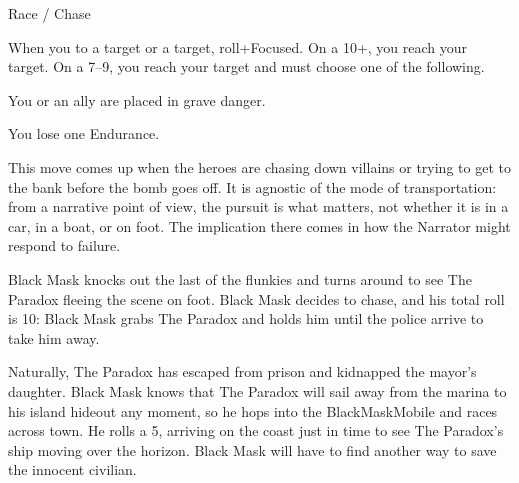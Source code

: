 \begin{movedef}{Race / Chase}
  {
    When you  to a target or 
    a target, roll+Focused. On
    a 10+, you reach your target. On a 7--9, you reach your target and
    must choose one of the following.
    \begin{choices}
    \item You or an ally are placed in grave danger.
    \item You lose one Endurance.
    \end{choices}
    \onamiss{}
  }
  {
    This move comes up when the heroes are chasing down villains
    or trying to get to the bank before the bomb goes off.
    It is agnostic of the mode of transportation: from a narrative
    point of view, the pursuit is what matters, not whether it is
    in a car, in a boat, or on foot. The implication there comes in
    how the Narrator might respond to failure.

    \begin{example}
      Black Mask knocks out the last of the flunkies and turns
      around to see The Paradox fleeing the scene on foot.
      Black Mask decides to chase, and his total roll is 10:
      Black Mask grabs The Paradox and holds him until the
      police arrive to take him away.
    \end{example}

    \begin{example}
      Naturally, The Paradox has escaped from prison and kidnapped
      the mayor's daughter. Black Mask knows that The Paradox will
      sail away from the marina to his island hideout
      any moment, so he hops into the Black\-Mask\-Mo\-bile
      and races across town.
      He rolls a 5, arriving on the coast just in time to see
      The Paradox's ship moving over the horizon.
      Black Mask will have to find another way to save the
      innocent civilian.
    \end{example}
  }
\end{movedef}

